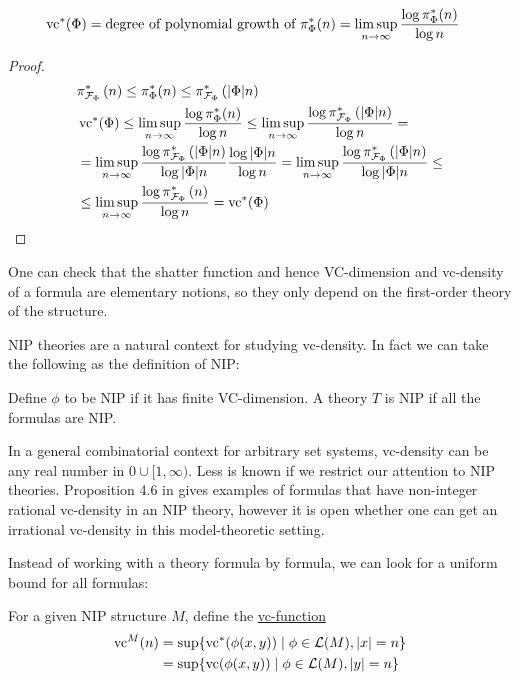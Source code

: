 \documentclass{amsart}
\newcommand{\F}{\mathcal F}
\renewcommand{\LL}{\mathcal L}
\newcommand{\paren}[1]{\left(#1\right)}
\newcommand{\defn}{\underline}
\begin{document}
\begin{Lemma} \label{count_types}
  \begin{align*}
    \operatorname{vc}^*(\Phi) &= \text{degree of polynomial growth of $\pi^*_\Phi(n)$}  = \limsup_{n \to \infty}\frac{\log \pi^*_\Phi(n)}{\log n}
  \end{align*}  
\end{Lemma}

\begin{proof}
  \begin{align*}
    &\pi^*_{\F_\Phi}\paren{n} \leq \pi^*_\Phi(n) \leq \pi^*_{\F_\Phi}\paren{|\Phi|n} \\
    &\vc^*(\Phi) \leq \limsup_{n \to \infty}\frac{\log \pi^*_\Phi(n)}{\log n} \leq \limsup_{n \to \infty}\frac{\log \pi^*_{\F_\Phi}\paren{|\Phi|n}}{\log n} = \\
    & = \limsup_{n \to \infty}\frac{\log \pi^*_{\F_\Phi}\paren{|\Phi|n}}{\log |\Phi|n} \frac{\log |\Phi|n}{\log n} =
      \limsup_{n \to \infty}\frac{\log \pi^*_{\F_\Phi}\paren{|\Phi|n}}{\log |\Phi|n} \leq \\
    &\leq \limsup_{n \to \infty}\frac{\log \pi^*_{\F_\Phi}\paren{n}}{\log n} = \vc^*(\Phi)
  \end{align*}
\end{proof} 

One can check that the shatter function and hence VC-dimension and vc-density of a formula are elementary notions,
so they only depend on the first-order theory of the structure.

NIP theories are a natural context for studying vc-density.
In fact we can take the following as the definition of NIP:
\begin{Definition}
  Define $\phi$ to be NIP if it has finite VC-dimension.
  A theory $T$ is NIP if all the formulas are NIP.
\end{Definition}

In a general combinatorial context for arbitrary set systems,
vc-density can be any real number in $0 \cup [1, \infty)$.
Less is known if we restrict our attention to NIP theories.
Proposition 4.6 in \cite{density} gives examples of formulas that have non-integer rational vc-density in an NIP theory,
however it is open whether one can get an irrational vc-density in this model-theoretic setting.

Instead of working with a theory formula by formula, we can look for a uniform bound for all formulas:
\begin{Definition} \label{vc_fn_def}
  For a given NIP structure $M$, define the \defn{vc-function}
  \begin{align*}
    \vc^M(n) &= \sup \{\vc^*(\phi(x, y)) \mid \phi \in \LL(M), |x| = n\} \\
             &= \sup \{\vc(\phi(x, y)) \mid \phi \in \LL(M), |y| = n\}
  \end{align*}
\end{Definition}
\end{document}
